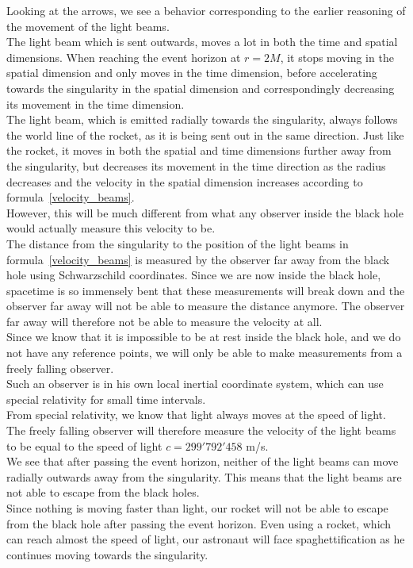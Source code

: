 \documentclass[reprint,english,notitlepage]{revtex4-2}
\begin{document}
        Looking at the arrows, we see a behavior corresponding to the earlier reasoning of the movement of the light beams.\\
        The light beam which is sent outwards, moves a lot in both the time and spatial dimensions.
        When reaching the event horizon at $r = 2M$, it stops moving in the spatial dimension and only moves in the time dimension, before accelerating towards the singularity in the spatial dimension and correspondingly decreasing its movement in the time dimension.\\
        The light beam, which is emitted radially towards the singularity, always follows the world line of the rocket, as it is being sent out in the same direction.
        Just like the rocket, it moves in both the spatial and time dimensions further away from the singularity, but decreases its movement in the time direction as the radius decreases and the velocity in the spatial dimension increases according to formula~\eqref{velocity_beams}.\\

        However, this will be much different from what any observer inside the black hole would actually measure this velocity to be.\\
        The distance from the singularity to the position of the light beams in formula~\eqref{velocity_beams} is measured by the observer far away from the black hole using Schwarzschild coordinates.
        Since we are now inside the black hole, spacetime is so immensely bent that these measurements will break down and the observer far away will not be able to measure the distance anymore.
        The observer far away will therefore not be able to measure the velocity at all.\\

        Since we know that it is impossible to be at rest inside the black hole, and we do not have any reference points, we will only be able to make measurements from a freely falling observer.\\
        Such an observer is in his own local inertial coordinate system, which can use special relativity for small time intervals.\\
        From special relativity, we know that light always moves at the speed of light.
        The freely falling observer will therefore measure the velocity of the light beams to be equal to the speed of light $c = 299'792'458$ m/s.\\

        We see that after passing the event horizon, neither of the light beams can move radially outwards away from the singularity.
        This means that the light beams are not able to escape from the black holes.\\
        Since nothing is moving faster than light, our rocket will not be able to escape from the black hole after passing the event horizon.
        Even using a rocket, which can reach almost the speed of light, our astronaut will face spaghettification as he continues moving towards the singularity.
\end{document}
